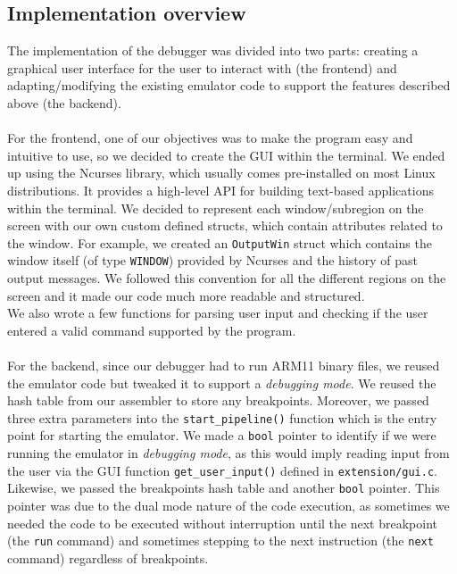 \documentclass[11pt]{article}
\begin{document}
\subsection{Implementation overview}
The implementation of the debugger was divided into two parts: creating a graphical user interface for the user to interact with (the frontend) and adapting/modifying the existing emulator code to support the features described above (the backend).
\\\\
For the frontend, one of our objectives was to make the program easy and intuitive to use, so we decided to create the GUI within the terminal. We ended up using the Ncurses library, which usually comes pre-installed on most Linux distributions. It provides a high-level API for building text-based applications within the terminal. We decided to represent each window/subregion on the screen with our own custom defined structs, which contain attributes related to the window. For example, we created an \texttt{OutputWin} struct which contains the window itself (of type \texttt{WINDOW}) provided by Ncurses and the history of past output messages. We followed this convention for all the different regions on the screen and it made our code much more readable and structured.\\
We also wrote a few functions for parsing user input and checking if the user entered a valid command supported by the program.
\\\\
For the backend, since our debugger had to run ARM11 binary files, we reused the emulator code but tweaked it to support a \textit{debugging mode}. We reused the hash table from our assembler to store any breakpoints. Moreover, we passed three extra parameters into the \texttt{start\_pipeline()} function which is the entry point for starting the emulator. We made a \texttt{bool} pointer to identify if we were running the emulator in \textit{debugging mode}, as this would imply reading input from the user via the GUI function \texttt{get\_user\_input()} defined in \texttt{extension/gui.c}. Likewise, we passed the breakpoints hash table and another \texttt{bool} pointer. This pointer was due to the dual mode nature of the code execution, as sometimes we needed the code to be executed without interruption until the next breakpoint (the \texttt{run} command) and sometimes stepping to the next instruction (the \texttt{next} command) regardless of breakpoints.
\end{document}
